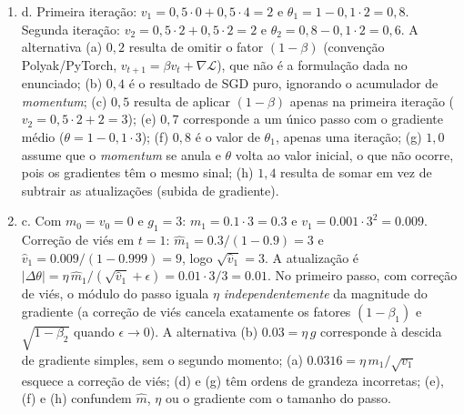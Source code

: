 \documentclass{dlproblemset}
\begin{document}
\begin{enumerate}[1)]
    \item d. Primeira iteração: $v_1 = 0{,}5 \cdot 0 + 0{,}5 \cdot 4 = 2$ e $\theta_1 = 1 - 0{,}1 \cdot 2 = 0{,}8$. Segunda iteração: $v_2 = 0{,}5 \cdot 2 + 0{,}5 \cdot 2 = 2$ e $\theta_2 = 0{,}8 - 0{,}1 \cdot 2 = 0{,}6$. A alternativa (a) $0{,}2$ resulta de omitir o fator $(1-\beta)$ (convenção Polyak/PyTorch, $v_{t+1} = \beta v_t + \nabla\mathcal{L}$), que não é a formulação dada no enunciado; (b) $0{,}4$ é o resultado de SGD puro, ignorando o acumulador de \textit{momentum}; (c) $0{,}5$ resulta de aplicar $(1-\beta)$ apenas na primeira iteração ($v_2 = 0{,}5\cdot 2 + 2 = 3$); (e) $0{,}7$ corresponde a um único passo com o gradiente médio ($\theta = 1 - 0{,}1 \cdot 3$); (f) $0{,}8$ é o valor de $\theta_1$, apenas uma iteração; (g) $1{,}0$ assume que o \textit{momentum} se anula e $\theta$ volta ao valor inicial, o que não ocorre, pois os gradientes têm o mesmo sinal; (h) $1{,}4$ resulta de somar em vez de subtrair as atualizações (subida de gradiente).

    \item c. Com $m_0 = v_0 = 0$ e $g_1 = 3$: $m_1 = 0.1\cdot 3 = 0.3$ e $v_1 = 0.001\cdot 3^2 = 0.009$. Correção de viés em $t = 1$: $\hat{m}_1 = 0.3/(1-0.9) = 3$ e $\hat{v}_1 = 0.009/(1-0.999) = 9$, logo $\sqrt{\hat{v}_1} = 3$. A atualização é $|\Delta\theta| = \eta\,\hat{m}_1/(\sqrt{\hat{v}_1} + \epsilon) = 0.01\cdot 3/3 = 0.01$. No primeiro passo, com correção de viés, o módulo do passo iguala $\eta$ \emph{independentemente} da magnitude do gradiente (a correção de viés cancela exatamente os fatores $(1-\beta_1)$ e $\sqrt{1-\beta_2}$ quando $\epsilon \to 0$). A alternativa (b) $0.03 = \eta\,g$ corresponde à descida de gradiente simples, sem o segundo momento; (a) $0.0316 = \eta\,m_1/\sqrt{v_1}$ esquece a correção de viés; (d) e (g) têm ordens de grandeza incorretas; (e), (f) e (h) confundem $\hat{m}$, $\eta$ ou o gradiente com o tamanho do passo.


\end{enumerate}
\end{document}
